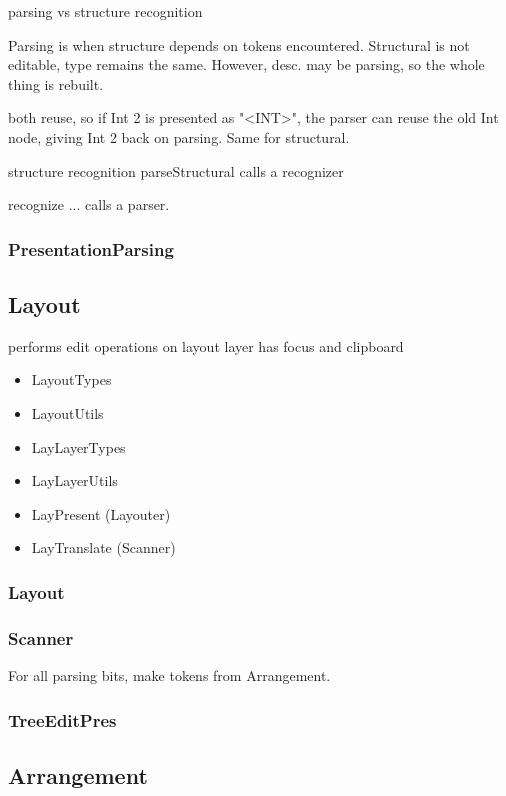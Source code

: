 \documentclass[]{article}
\begin{document}
parsing vs structure recognition

Parsing is when structure depends on tokens encountered. Structural is not editable, type remains the same. However, desc. may be parsing, so the whole thing is rebuilt.

both reuse, so if Int 2 is presented as "<INT>", the parser can reuse the old Int node, giving Int 2 back on parsing. Same for structural.

structure recognition 
parseStructural calls a recognizer

recognize ... calls a parser.




\subsubsection{PresentationParsing}


\subsection{Layout}
performs edit operations on layout layer
has focus and clipboard

\begin{itemize}
\item LayoutTypes
\item LayoutUtils
\item LayLayerTypes
\item LayLayerUtils
\item LayPresent (Layouter)
\item LayTranslate (Scanner)
\end{itemize}



\subsubsection{Layout}
\subsubsection{Scanner}

For all parsing bits, make tokens from Arrangement.

\subsubsection{TreeEditPres}


\subsection{Arrangement}
\end{document}
